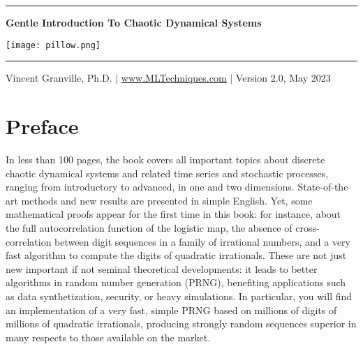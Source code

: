 \documentclass[oneside,10pt]{book}
\begin{document}
\hypersetup{linkcolor=blue}

\baselineskip
\thispagestyle{empty}
\hspace{0pt}
\vfill
\begin{center}
\rule{0.90\textwidth}{.4pt}
\end{center}

\begin{center}
{\Huge \bf{Gentle Introduction To Chaotic Dynamical Systems} }  
\end{center}


\baselineskip
\addvspace{2cm}
\begin{center}
\texttt{[image: pillow.png]}  
\end{center}
\addvspace{2cm}
\begin{center}
\rule{0.90\textwidth}{.4pt}
\end{center}
\begin{center}
Vincent Granville, Ph.D. $|$ \href{https://mltechniques.com/}{www.MLTechniques.com} $|$ Version 2.0, May 2023 
\end{center}

\hypersetup{linkcolor=red} %

\vfill
\hspace{0pt}
\pagebreak

\chapter*{Preface} %

In less than 100 pages, the book covers all important topics about discrete chaotic dynamical systems and
 related time series and stochastic processes, ranging from introductory to advanced, in one and two dimensions. State-of-the art methods and new results are
  presented in simple English. Yet, some mathematical proofs appear for the first time in this book: for instance,
 about the full autocorrelation function of the logistic map, the absence of cross-correlation between digit sequences
  in a family of irrational numbers, and a very fast algorithm to compute the digits of quadratic irrationals. These are not just new important if not seminal theoretical developments: it leads to  
 better algorithms in random number generation (PRNG), benefiting applications such as 
  data synthetization, security, or heavy simulations. In particular, you will find an implementation of a very fast, simple PRNG based on
 millions of digits of millions of quadratic irrationals, producing strongly random sequences superior in many respects to those available
 on the market. 
\end{document}
